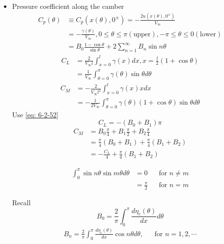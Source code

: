 \begin{itemize}
\begin{align}
\label{eq: 6-2-51}
\end{align}
Apply K.C.
\[
\gamma(x=l) = \gamma(\theta=0)=0\Longrightarrow\left.\frac{1}{\sin\theta}\left(\frac{K}{V_\infty B_0}+\cos\theta\right)\right|_{\theta = 0} = 0
\]
\[
\Longrightarrow K = -V_\infty B_0
\]
\begin{equation}
\therefore\gamma(\theta) = -2V_\infty\left(\frac{B_0}{2}\frac{1-\cos\theta}{\sin\theta}+\sum_{n=1}^\infty B_n\sin n\theta\right)
\label{eq: 6-2-52}
\end{equation}
\item Pressure coefficient along the camber
\begin{align}
C_p(\theta)
&\equiv C_p(x(\theta),0^\pm) = -\frac{2u(x(\theta),0^\pm)}{V_\infty} \nonumber\\
&= -\frac{\gamma(\theta)}{V_\infty},0\leq \theta\leq \pi(\text{upper}), -\pi\leq \theta\leq 0(\text{lower}) \nonumber\\ 
&= B_0\frac{1-\cos\theta}{\sin\theta} + 2\sum_{n=1}^\infty B_n\sin n\theta \label{eq: 6-2-53}
\end{align}
\begin{align}
C_L
&= \frac{2}{V_\infty l}\int_{x=0}^l\gamma(x)dx, x=\frac{l}{2}\left(1+\cos\theta\right)\nonumber \\
&= \frac{1}{V_\infty}\int_{\theta=0}^\pi\gamma(\theta)\sin\theta d\theta \label{eq: 6-2-54}
\end{align}
\begin{align}
C_M 
&= -\frac{2}{V_\infty l^2}\int_{x=0}^l\gamma(x)xdx \nonumber\\ 
&= -\frac{1}{2V_\infty}\int_{\theta = 0}^\pi\gamma(\theta)\left(1+\cos\theta\right)\sin\theta d\theta
\label{eq: 6-2-55}
\end{align}
Use \eqref{eq: 6-2-52}
\begin{equation}
C_L = -\left(B_0+B_1\right)\pi
\label{eq: 6-2-56}
\end{equation}
\begin{align}
C_M 
&=B_0\frac{\pi}{4} + B_1\frac{\pi}{2} + B_2\frac{\pi}{4} \nonumber \\
&= \frac{\pi}{4}\left(B_0+B_1\right) + \frac{\pi}{4}\left(B_1+B_2\right) \nonumber \\
&= -\frac{C_L}{4} + \frac{\pi}{4}\left(B_1+B_2\right)\label{eq: 6-2-57}
\end{align}
\begin{note}
\begin{align*}
\int_0^\pi\sin n\theta \sin m\theta d\theta 
&= 0 &&\text{for }n\neq m \\
&= \frac{\pi}{2} &&\text{for }n= m
\end{align*}
\end{note}
Recall
\[
B_0 = \frac{2}{\pi}\int_0^\pi\frac{d\eta_c(\theta)}{dx}d\theta
\]
\begin{align}
B_n = \frac{2}{\pi}\int_0^\pi\frac{d\eta_c(\theta)}{dx}\cos n\theta d\theta, && \text{for }n=1,2,\cdots
\label{eq: 6-2-58}
\end{align}
\end{itemize}
